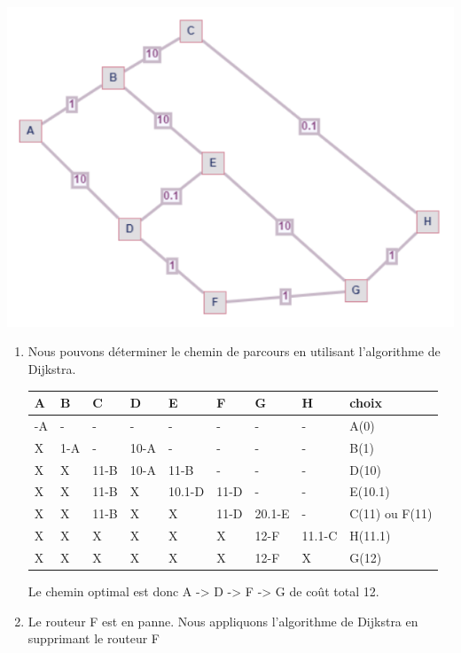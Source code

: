 \documentclass[
  letterpaper,
  DIV=11,
  numbers=noendperiod]{scrartcl}
\begin{document}
\begin{enumerate}
  \includegraphics{2023_CE_J1_fig1.png}

  \begin{enumerate}
  \def\labelenumii{\alph{enumii}.}
  \setcounter{enumii}{1}
  \item
    Nous pouvons déterminer le chemin de parcours en utilisant
    l'algorithme de Dijkstra.

    \begin{longtable}[]{@{}lllllllll@{}}
    \toprule\noalign{}
    A & B & C & D & E & F & G & H & choix \\
    \midrule\noalign{}
    \endhead
    \bottomrule\noalign{}
    \endlastfoot
    0-A & - & - & - & - & - & - & - & A(0) \\
    X & 1-A & - & 10-A & - & - & - & - & B(1) \\
    X & X & 11-B & 10-A & 11-B & - & - & - & D(10) \\
    X & X & 11-B & X & 10.1-D & 11-D & - & - & E(10.1) \\
    X & X & 11-B & X & X & 11-D & 20.1-E & - & C(11) ou F(11) \\
    X & X & X & X & X & X & 12-F & 11.1-C & H(11.1) \\
    X & X & X & X & X & X & 12-F & X & G(12) \\
    \end{longtable}

    Le chemin optimal est donc A -\textgreater{} D -\textgreater{} F
    -\textgreater{} G de coût total 12.
  \item
    Le routeur F est en panne. Nous appliquons l'algorithme de Dijkstra
    en supprimant le routeur F


\end{enumerate}
\end{enumerate}
\end{document}
